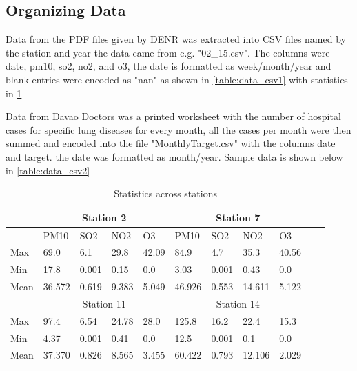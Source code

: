 \documentclass[10pt,11pt,12pt,oneside]{book}
\begin{document}
    \subsection{Organizing Data}
Data from the PDF files given by DENR was extracted into CSV files named by the station and year the data came from e.g. "02\_15.csv". The columns were date, pm10, so2, no2, and o3, the date is formatted as week/month/year and blank entries were encoded as "nan" as shown in \ref{table:data_csv1} with statistics in \ref{table:minMax}

Data from Davao Doctors was a printed worksheet with the number of hospital cases for specific lung diseases for every month, all the cases per month were then summed and encoded into the file "MonthlyTarget.csv" with the columns date and target. the date was formatted as month/year. Sample data is shown below in \ref{table:data_csv2}\\
\begin{table}[H]
    \centering
    \begin{tabular}{lllll|llllll}
\toprule 
      &\multicolumn{4}{c}{Station 2} & \multicolumn{4}{c}{Station 7} \\
    \midrule
     & PM10 & SO2 & NO2 & O3 & PM10 & SO2 & NO2 & O3 \\
    \midrule
    Max & 69.0 & 6.1 & 29.8 & 42.09 & 84.9 & 4.7 & 35.3 & 40.56 \\
    Min & 17.8 & 0.001 & 0.15 & 0.0 & 3.03 & 0.001 & 0.43 & 0.0  \\
    Mean & 36.572 & 0.619 & 9.383 & 5.049 & 46.926 & 0.553 & 14.611 & 5.122 \\
    \midrule
    & \multicolumn{4}{c}{Station 11} & \multicolumn{4}{c}{Station 14} \\
    \midrule
    Max & 97.4 & 6.54 & 24.78 & 28.0 & 125.8 & 16.2 & 22.4 & 15.3 \\
    Min & 4.37 & 0.001 & 0.41 & 0.0 & 12.5 & 0.001 & 0.1 & 0.0 \\
    Mean & 37.370 & 0.826 & 8.565 & 3.455 & 60.422 & 0.793 & 12.106 & 2.029 \\
    \bottomrule
\end{tabular}
    \caption{Statistics across stations}
    \label{table:minMax}
\end{table}
    
\end{document}
